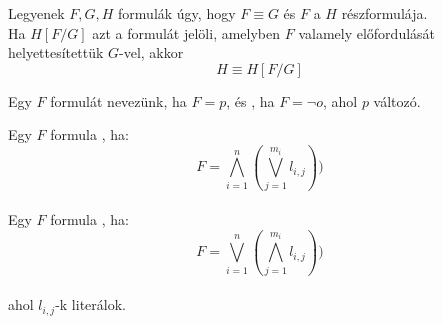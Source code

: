 \begin{frame}

\begin{tcolorbox}[title={Lemma: Helyettesítési Lemma}]
Legyenek $F, G, H$ formulák úgy, hogy $F \equiv G$ és $F$ a $H$ részformulája.\\
Ha $H[F/G]$ azt a formulát jelöli, amelyben $F$ valamely előfordulását helyettesítettük $G$-vel, akkor
$$H \equiv H[F/G]$$
\end{tcolorbox}

\end{frame}

\begin{frame}

\begin{tcolorbox}[title={Def.: Literál}]
Egy $F$ formulát  nevezünk, ha $F = p$, és , ha $F = {\neg}o$, ahol $p$ változó.
\end{tcolorbox}

\begin{tcolorbox}[title={Def.: Konjunktív, diszjunktív normálforma}]
Egy $F$ formula , ha:\\
$$F = \bigwedge_{i = 1}^n (\bigvee_{j = 1}^{m_i} l_{i, j}))$$\\
Egy $F$ formula , ha:\\
$$F = \bigvee_{i = 1}^n (\bigwedge_{j = 1}^{m_i} l_{i, j}))$$\\
ahol $l_{i, j}$-k literálok.
\end{tcolorbox}

\end{frame}

